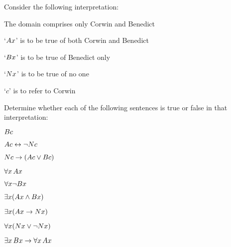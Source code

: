 \begin{practiceproblems}
\problempart
\label{pr.TorF1}
Consider the following interpretation:
	\begin{ebullet}
		\item The domain comprises only Corwin and Benedict
		\item `$\mathord{A}x$' is to be true of both Corwin and Benedict
		\item `$\mathord{B}x$' is to be true of Benedict only
		\item `$\mathord{N}x$' is to be true of no one
		\item `$c$' is to refer to Corwin
	\end{ebullet}
Determine whether each of the following sentences is true or false in that interpretation:
\begin{earg}
\item $\mathord{B}c$ \hfill {}
\item $\mathord{A}c \leftrightarrow \neg \mathord{N}c$ \hfill {}
\item $\mathord{N}c \rightarrow (\mathord{A}c \vee \mathord{B}c)$ \hfill {}
\item $\forall x\,\mathord{A}x$ \hfill {}
\item $\forall x \neg \mathord{B}x$ \hfill {}
\item $\exists x(\mathord{A}x \mathbin{\wedge} \mathord{B}x)$ \hfill {}
\item $\exists x(\mathord{A}x \rightarrow \mathord{N}x)$ \hfill {}
\item $\forall x(\mathord{N}x \vee \neg \mathord{N}x)$ \hfill {}
\item $\exists x\,\mathord{B}x \rightarrow \forall x\,\mathord{A}x$ \hfill {}
\end{earg}


\end{practiceproblems}

